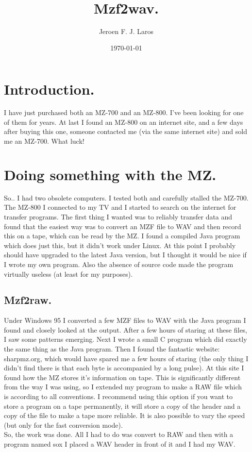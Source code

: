 \documentclass{article}
\title{\Huge Mzf2wav.}
\author{Jeroen F. J. Laros}
\date{\today}
\begin{document}
\maketitle
\newpage

\tableofcontents
\newpage

\section{Introduction.}
I have just purchased both an MZ-700 and an MZ-800. I've been looking for one 
of them for years. At last I found an MZ-800 on an internet site, and a few 
days after buying this one, someone contacted me (via the same internet site)
and sold me an MZ-700. What luck!

\section{Doing something with the MZ.}
So.. I had two obsolete computers. I tested both and carefully stalled the
MZ-700. The MZ-800 I connected to my TV and I started to search on the internet
for transfer programs. The first thing I wanted was to reliably transfer data
and found that the easiest way was to convert an MZF file to WAV and then 
record this on a tape, which can be read by the MZ. I found a compiled Java
program which does just this, but it didn't work under Linux. At this point
I probably should have upgraded to the latest Java version, but I thought it
would be nice if I wrote my own program. Also the absence of source code made
the program virtually useless (at least for my purposes).

\subsection{Mzf2raw.}
Under Windows 95 I converted a few MZF files to WAV with the Java program I
found and closely looked at the output. After a few hours of staring at these
files, I saw some patterns emerging. Next I wrote a small C program which did
exactly the same thing as the Java program. Then I found the fantastic website:
sharpmz.org, which would have spared me a few hours of staring (the only
thing I didn't find there is that each byte is accompanied by a long pulse).
At this site I found how the MZ stores it's information on tape. This is
significantly different from the way I was using, so I extended my program to
make a RAW file which is according to all conventions. I recommend using this
option if you want to store a program on a tape permanently, it will store a
copy of the header and a copy of the file to make a tape more reliable. It is
also possible to vary the speed (but only for the fast conversion mode). \\
So, the work was done. All I had to do was convert to RAW and then with a
program named sox I placed a WAV header in front of it and I had my WAV.
\end{document}
